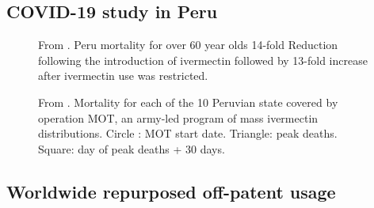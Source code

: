 \documentclass[11pt,a4paper,notitlepage]{report}
\begin{document}
\clearpage

\subsection*{COVID-19 study in Peru}

\begin{figure}[h]
    \centering
    \caption{From \citet{Chamie2021}. Peru mortality for over 60 year olds 14-fold Reduction following the introduction of ivermectin followed by 13-fold increase after ivermectin use was restricted.}
    \label{fig:peru-mortality}
\end{figure}

\begin{figure}[h]
    \centering
    \caption{From \citet{Chamie2021}. Mortality for each of the 10 Peruvian state covered by operation MOT, an army-led program of mass ivermectin distributions. Circle : MOT start date. Triangle: peak deaths. Square: day of peak deaths + 30 days.}
    \label{fig:peru-operation-mot}
\end{figure}

\clearpage

\subsection*{Worldwide repurposed off-patent usage}
\end{document}
